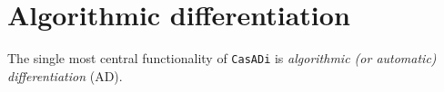 \documentclass[a4paper,12pt]{book}
\newcommand{\CasADi}{\texttt{CasADi}\xspace}
\newcounter{pytexcount}
\newcounter{pytexsubcount}
\renewenvironment{pytex}
{\addtocounter{pytexsubcount}{1}%
\begin{rawhtml}
<div style="color: black; background-color: \#b9c8db;  border-style: dotted; border-width: 1px; padding:2px;padding-left:1em" >
<pre>
\end{rawhtml}
}%
{\begin{rawhtml}
</pre>
</div>
<div style="color: black; background-color: \#fffff;  border-style: solid; border-width: 1px; padding:2px;padding-left:1em;margin-left:1em;" >\end{rawhtml}%
\verbatiminputeval{pytex_\alph{pytexcount}_\arabic{pytexsubcount}.log}%
\begin{rawhtml}
</div>
\end{rawhtml}
}
\begin{document}










\chapter{Algorithmic differentiation} \label{ch:ad}
The single most central functionality of \CasADi is \emph{algorithmic (or automatic) differentiation} (AD).
\end{document}
